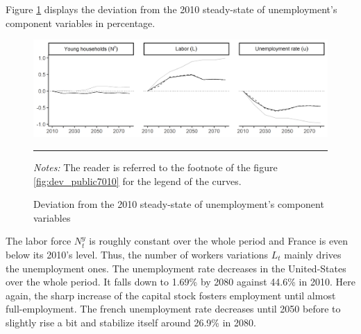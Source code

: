 Figure \ref{fig:dev_unemp1080} displays the deviation from the 2010 steady-state of unemployment's component variables in percentage.
\begin{figure}[tb]
	\centering
	\includegraphics[width=1\linewidth]{../result/deviation/dev_unemp1080.png}
	\caption{Deviation from the 2010 steady-state of unemployment's component variables}
	\label{fig:dev_unemp1080}
	\vspace{.5ex}
	\hrule
	\vspace{-4ex}
	\justify\singlespacing\footnotesize \textit{Notes:} The reader is referred to the footnote of the figure \ref{fig:dev_public7010} for the legend of the curves.
\end{figure}
The labor force $N^y_t$ is roughly constant over the whole period and France is even below its 2010's level. Thus, the number of workers variations $L_t$ mainly drives the unemployment ones. The unemployment rate decreases in the United-States over the whole period. It falls down to 1.69\% by 2080 against 44.6\% in 2010. Here again, the sharp increase of the capital stock fosters employment until almost full-employment. The french unemployment rate decreases until 2050 before to slightly rise a bit and stabilize itself around 26.9\% in 2080.

